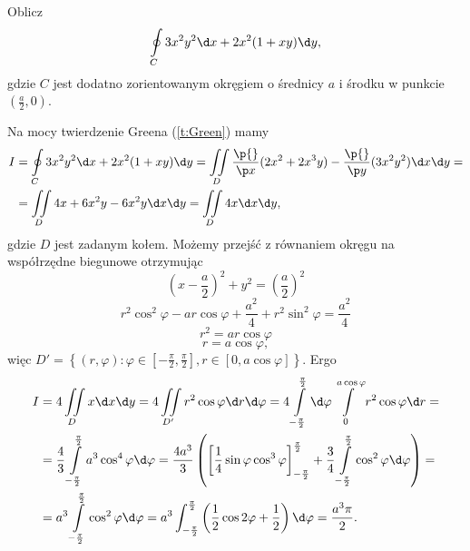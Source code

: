 \begin{example}
    Oblicz
    \[ \oint\limits_C 3x^2y^2 \d x + 2x^2(1 + xy) \d y, \]
    gdzie $C$ jest dodatno zorientowanym okręgiem o średnicy $a$ i środku w punkcie $(\frac{a}{2}, 0)$.
\end{example}
\begin{solution}
    Na mocy twierdzenie Greena (\ref{t:Green}) mamy
    \begin{align*}
        I &= \oint\limits_C 3x^2y^2 \d x + 2x^2(1 + xy) \d y = \iint\limits_D \frac{\p{}}{\p x}(2x^2 + 2x^3y) - \frac{\p{}}{\p y}(3x^2y^2) \d x \d y = \\
        &= \iint\limits_D 4x + 6x^2y - 6x^2y \d x \d y = \iint\limits_D 4x \d x \d y,
    \end{align*}
    gdzie $D$ jest zadanym kołem. Możemy przejść z równaniem okręgu na współrzędne biegunowe otrzymując
    \[ \left(x - \frac{a}{2}\right)^2 + y^2 = \left(\frac{a}{2}\right)^2 \]
    \[ r^2\cos^2\varphi - ar\cos\varphi + \frac{a^2}{4} + r^2\sin^2\varphi = \frac{a^2}{4} \]
    \[ r^2 = ar\cos\varphi \]
    \[ r = a\cos\varphi, \]
    więc $D' = \left\{(r, \varphi) : \varphi \in \left[-\frac{\pi}{2}, \frac{\pi}{2}\right], r \in [0, a\cos\varphi]\right\}$. Ergo
    \begin{align*}
        I &= 4\iint\limits_D x \d x \d y = 4\iint\limits_{D'} r^2\cos\varphi \d r \d \varphi = 4\int\limits_{-\frac{\pi}{2}}^{\frac{\pi}{2}} \d \varphi \int\limits_0^{a\cos\varphi} r^2\cos\varphi \d r = \\
        &= \frac{4}{3}\int\limits_{-\frac{\pi}{2}}^{\frac{\pi}{2}} a^3\cos^4\varphi \d \varphi = \frac{4a^3}{3}\left(\left[\frac{1}{4}\sin\varphi \cos^3\varphi\right]_{-\frac{\pi}{2}}^{\frac{\pi}{2}} + \frac{3}{4}\int\limits_{-\frac{\pi}{2}}^{\frac{\pi}{2}} \cos^2 \varphi \d \varphi\right) = \\
        &= a^3 \int\limits_{-\frac{\pi}{2}}^{\frac{\pi}{2}} \cos^2 \varphi \d \varphi = a^3 \int_{-\frac{\pi}{2}}^{\frac{\pi}{2}} \left(\frac{1}{2}\cos 2\varphi + \frac{1}{2}\right) \d \varphi = \frac{a^3\pi}{2}.
    \end{align*}
\end{solution}

